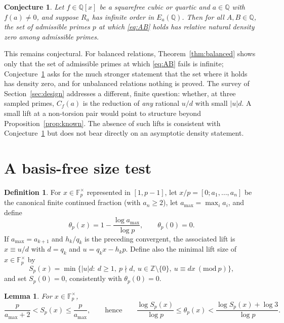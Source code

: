 \documentclass[11pt,a4paper]{article}
\numberwithin{equation}{section}
\theoremstyle{plain}
\newtheorem{lemma}[theorem]{Lemma}
\newtheorem{conjecture}[theorem]{Conjecture}
\theoremstyle{definition}
\newtheorem{definition}[theorem]{Definition}
\newcommand{\F}{\mathbb{F}}
\newcommand{\Q}{\mathbb{Q}}
\newcommand{\Z}{\mathbb{Z}}
\begin{document}
\begin{conjecture}\label{conj}
Let $f\in\Q[x]$ be a squarefree cubic or quartic and $a\in\Q$ with $f(a)\neq0$, and suppose $R_a$ has infinite order in $E_a(\Q)$. Then for all $A,B\in\Q$, the set of admissible primes $p$ at which \eqref{eq:AB} holds has relative natural density zero among admissible primes.
\end{conjecture}

This remains conjectural. For balanced relations, Theorem~\ref{thm:balanced} shows only that the set of admissible primes at which \eqref{eq:AB} fails is infinite; Conjecture~\ref{conj} asks for the much stronger statement that the set where it holds has density zero, and for unbalanced relations nothing is proved. The survey of Section~\ref{sec:design} addresses a different, finite question: whether, at three sampled primes, $C_f(a)$ is the reduction of \emph{any} rational $u/d$ with small $|u|d$. A small lift at a non-torsion pair would point to structure beyond Proposition~\ref{prop:known}. The absence of such lifts is consistent with Conjecture~\ref{conj} but does not bear directly on an asymptotic density statement.

\section{A basis-free size test}\label{sec:test}

\begin{definition}\label{def:theta}
For $x\in\F_p^\times$ represented in $[1,p-1]$, let $x/p=[0;a_1,\dots,a_n]$ be the canonical finite continued fraction (with $a_n\ge2$), let $a_{\max}=\max_i a_i$, and define
\begin{equation}\label{eq:theta-def}
\theta_p(x)=1-\frac{\log a_{\max}}{\log p},\qquad\theta_p(0)=0.
\end{equation}
If $a_{\max}=a_{k+1}$ and $h_k/q_k$ is the preceding convergent, the associated lift is $x\equiv u/d$ with $d=q_k$ and $u=q_kx-h_kp$. Define also the minimal lift size of $x\in\F_p^\times$ by
\begin{equation}\label{eq:Sp}
S_p(x)=\min\bigl\{|u|d:\ d\ge1,\ p\nmid d,\ u\in\Z\setminus\{0\},\ u\equiv dx\ (\mathrm{mod}\ p)\bigr\},
\end{equation}
and set $S_p(0)=0$, consistently with $\theta_p(0)=0$.
\end{definition}

\begin{lemma}\label{lem:lift}
For $x\in\F_p^\times$,
\begin{equation}\label{eq:lift-bounds}
\frac{p}{a_{\max}+2}<S_p(x)\le\frac{p}{a_{\max}},\qquad\text{hence}\qquad
\frac{\log S_p(x)}{\log p}\le\theta_p(x)<\frac{\log S_p(x)+\log3}{\log p}.
\end{equation}
\end{lemma}
\end{document}
